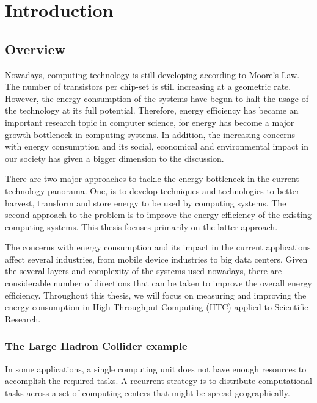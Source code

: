 \chapter{Introduction}

\section{Overview}
Nowadays, computing technology is still developing according to Moore's Law. The number of transistors per
chip-set is still increasing at a geometric rate. However, the energy
consumption of the systems have begun to halt the usage of the technology at its
full potential. Therefore, energy efficiency has became an important
research topic in computer science, for energy has become a major growth
bottleneck in computing systems. In addition, the increasing concerns with energy consumption and
its social, economical and environmental impact in our society has given a
bigger dimension to the discussion.


There are two major approaches to tackle the energy bottleneck in the current
technology panorama. One, is to develop techniques and technologies to better harvest, 
transform and store energy to be used by computing systems. The second approach to the problem is to improve the energy efficiency of the existing computing systems. This thesis focuses primarily on the latter approach. 

The concerns with energy consumption and its impact in the current
applications affect several industries, from mobile device industries to big data centers. 
Given the several layers and complexity of the systems used nowadays, there are 
considerable number of directions that can be taken to improve the overall energy efficiency. Throughout this thesis, we will focus on measuring and improving the energy
consumption in High Throughput Computing (HTC) applied to Scientific Research.


\subsection*{The Large Hadron Collider example}
In some applications, a single computing unit does not have enough resources to
accomplish the required tasks. A recurrent strategy is to distribute computational tasks
across a set of computing centers that might be spread geographically.

